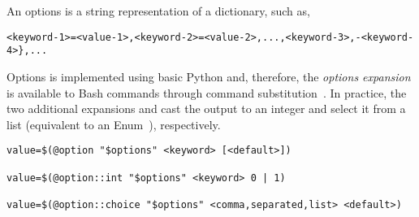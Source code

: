 
An options is a string representation of a dictionary, such as,
%
\begin{graybox}
\begin{verbatim}
<keyword-1>=<value-1>,<keyword-2>=<value-2>,...,<keyword-3>,-<keyword-4>},...
\end{verbatim}
\end{graybox}
%
Options is implemented using basic Python and, therefore, the \emph{options expansion} is available to Bash commands through command substitution~\cite{command_substitution}. In practice, the two additional expansions  and  cast the output to an integer and select it from a list (equivalent to an Enum~\cite{python_eunum}), respectively.
%
\begin{graybox}
\begin{verbatim}
value=$(@option "$options" <keyword> [<default>])

value=$(@option::int "$options" <keyword> 0 | 1)

value=$(@option::choice "$options" <comma,separated,list> <default>)
\end{verbatim}
\end{graybox}
